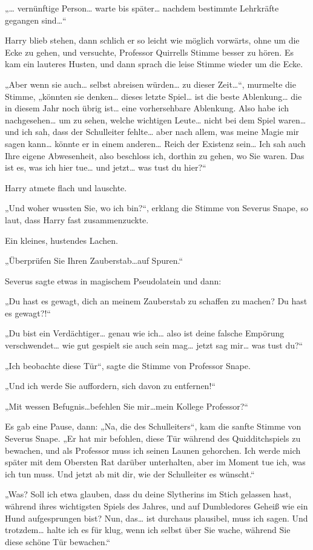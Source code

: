 {„… vernünftige Person… warte bis später… nachdem bestimmte Lehrkräfte gegangen sind…“

Harry blieb stehen, dann schlich er so leicht wie möglich vorwärts, ohne um die Ecke zu gehen, und versuchte, Professor Quirrells Stimme besser zu hören. Es kam ein lauteres Husten, und dann sprach die leise Stimme wieder um die Ecke.

„Aber wenn sie auch… selbst abreisen würden… zu dieser Zeit…“, murmelte die Stimme, „könnten sie denken… dieses letzte Spiel… ist die beste Ablenkung… die in diesem Jahr noch übrig ist… eine vorhersehbare Ablenkung. Also habe ich nachgesehen… um zu sehen, welche wichtigen Leute… nicht bei dem Spiel waren… und ich sah, dass der Schulleiter fehlte… aber nach allem, was meine Magie mir sagen kann… könnte er in einem anderen… Reich der Existenz sein… Ich sah auch Ihre eigene Abwesenheit, also beschloss ich, dorthin zu gehen, wo Sie waren. Das ist es, was ich hier tue… und jetzt… was tust du hier?“

Harry atmete flach und lauschte.

„Und woher wussten Sie, wo ich bin?“, erklang die Stimme von Severus Snape, so laut, dass Harry fast zusammenzuckte.

Ein kleines, hustendes Lachen.

„Überprüfen Sie Ihren Zauberstab…auf Spuren.“

Severus sagte etwas in magischem Pseudolatein und dann:

„Du hast es gewagt, dich an meinem Zauberstab zu schaffen zu machen? Du hast es gewagt?!“

„Du bist ein Verdächtiger… genau wie ich… also ist deine falsche Empörung verschwendet… wie gut gespielt sie auch sein mag… jetzt sag mir… was tust du?“

„Ich beobachte diese Tür“, sagte die Stimme von Professor Snape.

„Und ich werde Sie auffordern, sich davon zu entfernen!“

„Mit wessen Befugnis…befehlen Sie mir…mein Kollege Professor?“

Es gab eine Pause, dann: „Na, die des Schulleiters“, kam die sanfte Stimme von Severus Snape. „Er hat mir befohlen, diese Tür während des Quidditchspiels zu bewachen, und als Professor muss ich seinen Launen gehorchen. Ich werde mich später mit dem Obersten Rat darüber unterhalten, aber im Moment tue ich, was ich tun muss. Und jetzt ab mit dir, wie der Schulleiter es wünscht.“

„Was? Soll ich etwa glauben, dass du deine Slytherins im Stich gelassen hast, während ihres wichtigsten Spiels des Jahres, und auf Dumbledores Geheiß wie ein Hund aufgesprungen bist? Nun, das… ist durchaus plausibel, muss ich sagen. Und trotzdem… halte ich es für klug, wenn ich selbst über Sie wache, während Sie diese schöne Tür bewachen.“

}

